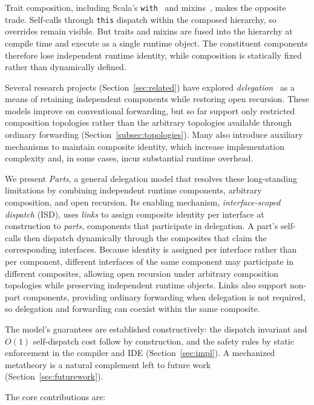 \documentclass[acmsmall,screen,review,anonymous]{acmart}
\theoremstyle{acmplain}
\newcommand{\code}[1]{\texttt{#1}}
\begin{document}
Trait composition, including Scala's \code{with}~\cite{odersky2005} and mixins~\cite{bracha1990}, makes the opposite
trade. Self-calls through \code{this} dispatch within the composed hierarchy, so overrides remain visible. But traits
and mixins are fused into the hierarchy at compile time and execute as a single runtime object. The constituent
components therefore lose independent runtime identity, while composition is statically fixed rather than dynamically
defined.

Several research projects (Section~\ref{sec:related}) have explored \emph{delegation}~\cite{lieberman1986,kniesel1999}
as a means of retaining independent components while restoring open recursion. These models improve on conventional
forwarding, but so far support only restricted composition topologies rather than the arbitrary topologies available
through ordinary forwarding (Section~\ref{subsec:topologies}). Many also introduce auxiliary mechanisms to maintain
composite identity, which increase implementation complexity and, in some cases, incur substantial runtime overhead.

We present \emph{Parts}, a general delegation model that resolves these long-standing limitations by combining independent runtime
components, arbitrary composition, and open recursion. Its enabling mechanism, \emph{interface-scoped dispatch} (ISD), uses \emph{links} to assign
composite identity per interface at construction to \emph{parts}, components that participate in delegation. A part's
self-calls then dispatch dynamically through the composites that claim the corresponding interfaces. Because identity
is assigned per interface rather than per component, different interfaces of the same component may participate in
different composites, allowing open recursion under arbitrary composition topologies while preserving independent
runtime objects. Links also support non-part components, providing ordinary forwarding when delegation is not required,
so delegation and forwarding can coexist within the same composite.

The model's guarantees are established constructively: the dispatch invariant and $O(1)$ self-dispatch cost follow by construction,
and the safety rules by static enforcement in the compiler and IDE (Section~\ref{sec:impl}). A mechanized metatheory is
a natural complement left to future work (Section~\ref{sec:futurework}).

The core contributions are:
\end{document}
